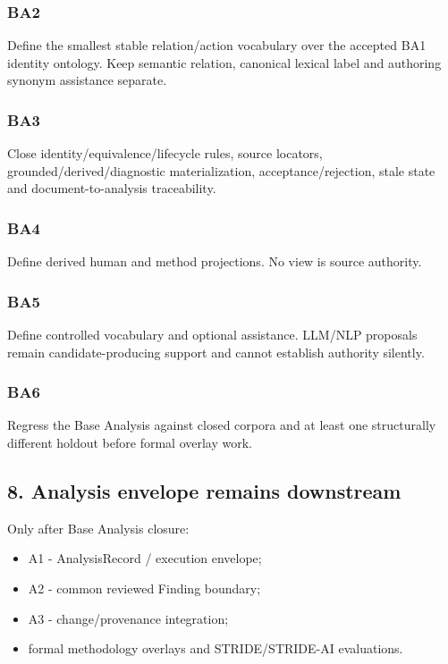 \documentclass[
]{article}
\providecommand{\tightlist}{%
  \setlength{\itemsep}{0pt}\setlength{\parskip}{0pt}}
\begin{document}
\subsubsection{BA2}\label{ba2}

Define the smallest stable relation/action vocabulary over the accepted
BA1 identity ontology. Keep semantic relation, canonical lexical label
and authoring synonym assistance separate.

\subsubsection{BA3}\label{ba3}

Close identity/equivalence/lifecycle rules, source locators,
grounded/derived/diagnostic materialization, acceptance/rejection, stale
state and document-to-analysis traceability.

\subsubsection{BA4}\label{ba4}

Define derived human and method projections. No view is source
authority.

\subsubsection{BA5}\label{ba5}

Define controlled vocabulary and optional assistance. LLM/NLP proposals
remain candidate-producing support and cannot establish authority
silently.

\subsubsection{BA6}\label{ba6}

Regress the Base Analysis against closed corpora and at least one
structurally different holdout before formal overlay work.

\subsection{8. Analysis envelope remains
downstream}\label{8-analysis-envelope-remains-downstream}

Only after Base Analysis closure:

\begin{itemize}
\tightlist
\item
  A1 - AnalysisRecord / execution envelope;
\item
  A2 - common reviewed Finding boundary;
\item
  A3 - change/provenance integration;
\item
  formal methodology overlays and STRIDE/STRIDE-AI evaluations.
\end{itemize}
\end{document}
